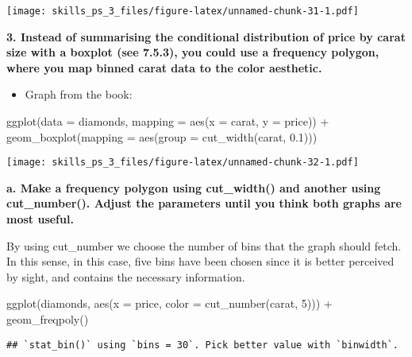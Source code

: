 \documentclass[
]{article}
\newenvironment{Shaded}{\begin{snugshade}}{\end{snugshade}}
\newcommand{\AttributeTok}[1]{\textcolor[rgb]{0.77,0.63,0.00}{#1}}
\newcommand{\DecValTok}[1]{\textcolor[rgb]{0.00,0.00,0.81}{#1}}
\newcommand{\FloatTok}[1]{\textcolor[rgb]{0.00,0.00,0.81}{#1}}
\newcommand{\FunctionTok}[1]{\textcolor[rgb]{0.00,0.00,0.00}{#1}}
\newcommand{\NormalTok}[1]{#1}
\newcommand{\SpecialCharTok}[1]{\textcolor[rgb]{0.00,0.00,0.00}{#1}}
\providecommand{\tightlist}{%
  \setlength{\itemsep}{0pt}\setlength{\parskip}{0pt}}
\begin{document}
\texttt{[image: skills\_ps\_3\_files/figure-latex/unnamed-chunk-31-1.pdf]}

\textbf{3. Instead of summarising the conditional distribution of price
by carat size with a boxplot (see 7.5.3), you could use a frequency
polygon, where you map binned carat data to the color aesthetic.}

\begin{itemize}
\tightlist
\item
  Graph from the book:
\end{itemize}

\begin{Shaded}
\begin{Highlighting}[]
\FunctionTok{ggplot}\NormalTok{(}\AttributeTok{data =}\NormalTok{ diamonds, }\AttributeTok{mapping =} \FunctionTok{aes}\NormalTok{(}\AttributeTok{x =}\NormalTok{ carat, }\AttributeTok{y =}\NormalTok{ price)) }\SpecialCharTok{+} 
  \FunctionTok{geom\_boxplot}\NormalTok{(}\AttributeTok{mapping =} \FunctionTok{aes}\NormalTok{(}\AttributeTok{group =} \FunctionTok{cut\_width}\NormalTok{(carat, }\FloatTok{0.1}\NormalTok{)))}
\end{Highlighting}
\end{Shaded}

\texttt{[image: skills\_ps\_3\_files/figure-latex/unnamed-chunk-32-1.pdf]}

\textbf{a. Make a frequency polygon using cut\_width() and another using
cut\_number(). Adjust the parameters until you think both graphs are
most useful.}

By using cut\_number we choose the number of bins that the graph should
fetch. In this sense, in this case, five bins have been chosen since it
is better perceived by sight, and contains the necessary information.

\begin{Shaded}
\begin{Highlighting}[]
\FunctionTok{ggplot}\NormalTok{(diamonds, }\FunctionTok{aes}\NormalTok{(}\AttributeTok{x =}\NormalTok{ price, }\AttributeTok{color =} \FunctionTok{cut\_number}\NormalTok{(carat, }\DecValTok{5}\NormalTok{))) }\SpecialCharTok{+} 
    \FunctionTok{geom\_freqpoly}\NormalTok{()}
\end{Highlighting}
\end{Shaded}

\begin{verbatim}
## `stat_bin()` using `bins = 30`. Pick better value with `binwidth`.
\end{verbatim}
\end{document}
